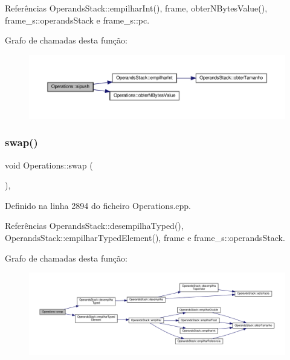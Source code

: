 Referências Operands\+Stack\+::empilhar\+Int(), frame, obter\+N\+Bytes\+Value(), frame\+\_\+s\+::operands\+Stack e frame\+\_\+s\+::pc.

Grafo de chamadas desta função\+:
\nopagebreak
\begin{figure}[H]
\begin{center}
\leavevmode
\includegraphics[width=350pt]{classOperations_aed3838c73d7febfcacab9f101e6946ad_cgraph}
\end{center}
\end{figure}
\mbox{\label{classOperations_ad800d04ce11806455dd5b84a7ecd6144}} 
\subsubsection{\texorpdfstring{swap()}{swap()}}
{\footnotesize\ttfamily void Operations\+::swap (\begin{DoxyParamCaption}{ }\end{DoxyParamCaption})\hspace{0.3cm}{\ttfamily [static]}, {\ttfamily [private]}}



Definido na linha 2894 do ficheiro Operations.\+cpp.



Referências Operands\+Stack\+::desempilha\+Typed(), Operands\+Stack\+::empilhar\+Typed\+Element(), frame e frame\+\_\+s\+::operands\+Stack.

Grafo de chamadas desta função\+:
\nopagebreak
\begin{figure}[H]
\begin{center}
\leavevmode
\includegraphics[width=350pt]{classOperations_ad800d04ce11806455dd5b84a7ecd6144_cgraph}
\end{center}
\end{figure}
\mbox{\label{classOperations_a72955f43cde98b73c503e1a8c1505352}} 
